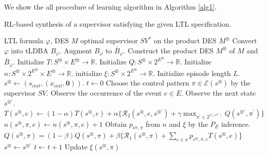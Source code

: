 \documentclass[letterpaper, 10 pt, conference, dvipdfmx]{ieeeconf}
\newcommand{\myspq}{\ensuremath{[\![s^{\otimes}]\!]}_q}
\begin{document}
We show the all procedure of learning algorithm in Algorithm \ref{alg1}.

\begin{algorithm}
 \caption{RL-based synthesis of a supervisor satisfying the given LTL specification.}
 \begin{algorithmic}[1]
 \renewcommand{\algorithmicrequire}{\textbf{Input:}}
 \renewcommand{\algorithmicensure}{\textbf{Output:}}
 \REQUIRE LTL formula $\varphi$, DES $M$
 \ENSURE  optimal supervisor $SV^{\ast}$ on the product DES $M^{\otimes}$
  \STATE Convert $\varphi$ into tLDBA $B_{\varphi}$.
  \STATE Augment $B_{\varphi}$ to $\bar{B}_{\varphi}$.
  \STATE Construct the product DES $M^{\otimes}$ of $M$ and $\bar{B}_{\varphi}$.
  \STATE Initialize $T:S^{\otimes} \times E^{\otimes} \rightarrow \mathbb{R}$.
  \STATE Initialize $Q:S^{\otimes} \times 2^{E^{\otimes}} \rightarrow \mathbb{R}$.
  \STATE Initialize $n:S^{\otimes} \times 2^{E^{\otimes}} \times E^{\otimes} \rightarrow \mathbb{R}$.
  \STATE initialize $\xi:S^{\otimes} \times 2^{E^{\otimes}} \rightarrow \mathbb{R}$.
  \STATE Initialize episode length $L$.
  \STATE $s^{\otimes} \leftarrow (s_{init},(x_{init},\bm{0}))$.
  \STATE $t \leftarrow 0$
  \WHILE {$t <L$ and $\myspq \notin SinkSet$ }
  \STATE Choose the control pattern $\pi \in \mathcal{E}(s^{\otimes})$ by the supervisor $SV$.
  \STATE Observe the occurrence of the event $e \in E$.
  \STATE Observe the next state $s^{\otimes \prime}$.
  \STATE $T(s^{\otimes},e) \leftarrow (1-\alpha)T(s^{\otimes},e) + \alpha \{ \mathcal{R}_2(s^{\otimes},e,s^{\otimes \prime}) + \gamma \max_{\pi^{\prime} \in 2^{\mathcal{E}(s^{\otimes \prime})}}Q(s^{\otimes \prime},\pi^{\prime}) \}$
  \STATE $n(s^{\otimes}, \pi, e) \leftarrow n(s^{\otimes}, \pi, e) + 1$
  \STATE Obtain $p_{s^{\otimes},\pi}$ from $n$ and $\xi$ by the $P_E$ inference.
  \STATE $Q(s^{\otimes},\pi) = (1-\beta)Q(s^{\otimes},\pi) + \beta \{\mathcal{R}_1(s^{\otimes},\pi) + \sum_{e \in \pi} p_{s^{\otimes},\pi,e} T(s^{\otimes},e)$\}
  \STATE $s^{\otimes} \leftarrow s^{\otimes \prime}$
  \STATE $t \leftarrow t + 1$
  \STATE Update $\xi(s^{\otimes}, \pi)$
  \ENDWHILE
  \ENDWHILE
 \end{algorithmic}
 \label{alg1}
 \end{algorithm}
\end{document}
